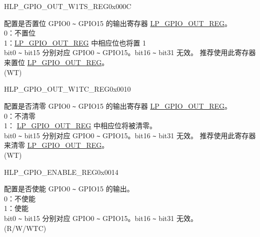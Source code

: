 \begin{register}{H}{LP\_GPIO\_OUT\_W1TS\_REG}{0x000C}\label{regdesc:LPGPIOOUTW1TSREG}
%
%
\regnewline%
\begin{regdesc}\begin{reglist}
\label{fielddesc:LPGPIOOUTDATAW1TS}\item [LP\_GPIO\_OUT\_DATA\_W1TS] 配置是否置位 GPIO0 \verb+~+ GPIO15 的输出寄存器 \hyperref[regdesc:LPGPIOOUTREG]{LP\_GPIO\_OUT\_REG}。\\
0：不置位\\
1：\hyperref[regdesc:LPGPIOOUTREG]{LP\_GPIO\_OUT\_REG} 中相应位也将置 1 \\
bit0 \verb+~+ bit15 分别对应 GPIO0 \verb+~+ GPIO15。bit16 \verb+~+ bit31 无效。
 推荐使用此寄存器来置位  \hyperref[regdesc:LPGPIOOUTREG]{LP\_GPIO\_OUT\_REG}。\\
(WT)
\end{reglist}\end{regdesc}
\end{register}


\begin{register}{H}{LP\_GPIO\_OUT\_W1TC\_REG}{0x0010}\label{regdesc:LPGPIOOUTW1TCREG}
%
%
\regnewline%
\begin{regdesc}\begin{reglist}
\label{fielddesc:LPGPIOOUTDATAW1TC}\item [LP\_GPIO\_OUT\_DATA\_W1TC] 配置是否清零 GPIO0 \verb+~+ GPIO15 的输出寄存器  \hyperref[regdesc:LPGPIOOUTREG]{LP\_GPIO\_OUT\_REG}。\\
0：不清零 \\
 1： \hyperref[regdesc:LPGPIOOUTREG]{LP\_GPIO\_OUT\_REG} 中相应位将被清零。 \\
bit0 \verb+~+ bit15 分别对应 GPIO0 \verb+~+ GPIO15。bit16 \verb+~+ bit31 无效。
 推荐使用此寄存器来清零  \hyperref[regdesc:LPGPIOOUTREG]{LP\_GPIO\_OUT\_REG}。\\
(WT)
\end{reglist}\end{regdesc}
\end{register}


\begin{register}{H}{LP\_GPIO\_ENABLE\_REG}{0x0014}\label{regdesc:LPGPIOENABLEREG}
%
%
\regnewline%
\begin{regdesc}\begin{reglist}
\label{fielddesc:LPGPIOENABLEDATA}\item [LP\_GPIO\_ENABLE\_DATA] 配置是否使能 GPIO0 \verb+~+ GPIO15 的输出。\\
0：不使能\\
1：使能\\
bit0 \verb+~+ bit15 分别对应 GPIO0 \verb+~+ GPIO15。bit16 \verb+~+ bit31 无效。\\
(R/W/WTC)
\end{reglist}\end{regdesc}
\end{register}


